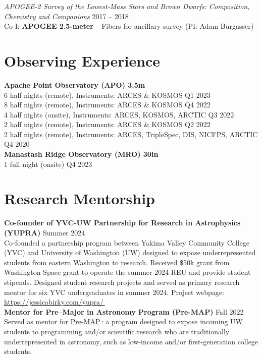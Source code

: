 \documentclass[a4,11pt]{article}
\let\orighref\href
\renewcommand{\href}[2]{\orighref{#1}{#2\,\scriptsize\faExternalLink}}
\begin{document}
\textsl{APOGEE-2 Survey of the Lowest-Mass Stars and Brown Dwarfs: Composition, Chemistry and Companions} \hfill 2017 -- 2018 \\
Co-I: \textbf{APOGEE 2.5-meter} -- Fibers for ancillary survey (PI: Adam Burgasser) 

\section{Observing Experience}
\textbf{Apache Point Observatory (APO) 3.5m}  \\
6 half nights (remote), Instruments: ARCES \& KOSMOS \hfill Q1 2023 \\
8 half nights (remote), Instruments: ARCES \& KOSMOS \hfill Q4 2022 \\
4 half nights (onsite), Instruments: ARCES, KOSMOS, ARCTIC \hfill Q3 2022 \\
2 half nights (remote), Instruments: ARCES \& KOSMOS \hfill Q2 2022 \\
2 half nights (remote), Instruments: ARCES, TripleSpec, DIS, NICFPS, ARCTIC \hfill Q4 2020 \\

\vspace{.2cm}
\textbf{Manastash Ridge Observatory (MRO) 30in} \\
1 full night (onsite) \hfill Q4 2023


\section{Research Mentorship}

\textbf{Co-founder of YVC-UW Partnership for Research in Astrophysics (YUPRA)} \hfill Summer 2024 \\
\vspace{.1cm}
Co-founded a partnership program between Yakima Valley Community College (YVC) and University of Washington (UW) designed to expose underrepresented students from eastern Washington to research. Received \$50k grant from Washington Space grant to operate the summer 2024 REU and provide student stipends. Designed student research projects and served as primary research mentor for six YVC undergraduates in summer 2024. Project webpage: \href{https://jessicabirky.com/yupra/}{https://jessicabirky.com/yupra/}  \\

\vspace{.3cm}
\textbf{Mentor for Pre–Major in Astronomy Program (Pre-MAP)} \hfill Fall 2022 \\
\vspace{.1cm}
Served as mentor for \href{http://depts.washington.edu/premap/about/}{Pre-MAP}: a program designed to expose incoming UW students to programming and/or scientific research who are traditionally underrepresented in astronomy, such as low-income and/or first-generation college students. \\
\end{document}
